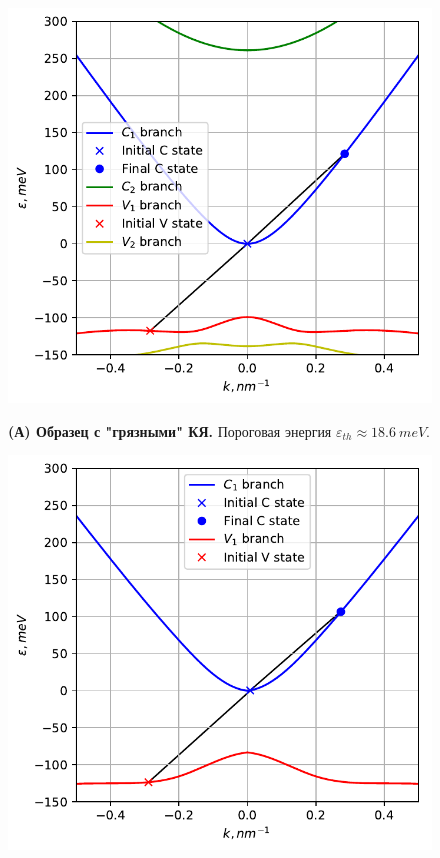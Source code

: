 \documentclass[../main.tex]{subfiles}
\begin{document}
        \begin{figure}[h!]
            \begin{minipage}[h]{0.49\linewidth}
                \begin{center}
                    \includegraphics[width=1.\linewidth]{./images/main_14u_80K_pic.pdf}

                    \textbf{(А) Образец с "грязными" КЯ.} Пороговая энергия 
                        $\varepsilon_{th} \approx 18.6~meV$.
                \end{center}
            \end{minipage}
            \hfill
            \begin{minipage}[h]{0.49\linewidth}
                \begin{center}
                    \includegraphics[width=1.\linewidth]{./images/14u_pure_80K.pdf}


\end{center}
\end{minipage}
\end{figure}
\end{document}
